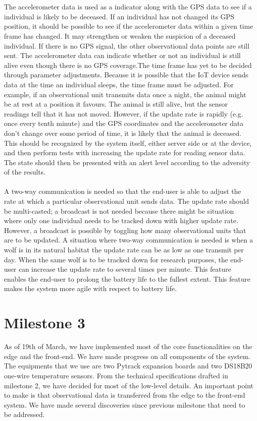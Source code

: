 		\\\\
		The accelerometer data is used as a indicator along with the GPS data to see if a individual is likely to be deceased. If an individual has not changed its GPS position, it should be possible to see if the accelerometer data within a given time frame has changed. It may strengthen or weaken the suspicion of a deceased individual. If there is no GPS signal, the other observational data points are still sent. The accelerometer data can indicate whether or not an individual is still alive even though there is no GPS coverage.The time frame has yet to be decided through parameter adjustments. Because it is possible that the IoT device sends data at the time an individual sleeps, the time frame must be adjusted. For example, if an observational unit transmits data once a night, the animal might be at rest at a 
		position it favours. The animal is still alive, but the sensor readings tell that it has not moved. However, if the update rate is rapidly (e.g. once every tenth minute) and the GPS coordinates and the accelerometer data don’t change over some period of time, it is likely that the animal is deceased. This should be recognized by the system itself, either server side or at the device, and then perform tests with increasing the update rate for reading sensor data. The state should then be presented with an alert level according to the adversity of the results.
		\\\\
		A two-way communication is needed so that the end-user is able to adjust the rate at which a particular observational unit sends data. The update rate should be multi-casted; a broadcast is not needed because there might be situation where only one individual needs to be tracked down with higher update rate. However, a broadcast is possible by toggling how many observational units that are to be updated. A situation where two-way communication is needed is  when a wolf is in its natural habitat the update rate can be as low as one transmit per day. When the same wolf is to be tracked down for research purposes, the end-user can increase the update rate to several times per minute. This feature enables the end-user to prolong the battery life to the fullest extent. This feature makes the system more agile with respect to battery life. 

\section{Milestone 3}
	As of 19th of March, we have implemented most of the core functionalities on the edge and the front-end. We have made progress on all components of the system. The equipments that we use are two Pytrack expansion boards and two DS18B20 one-wire temperature sensors. From the technical specifications drafted in milestone 2, we have decided for most of the low-level details. An important point to make is that observational data is transferred from the edge to the front-end system. We have made several discoveries since previous milestone that need to be addressed.
 

